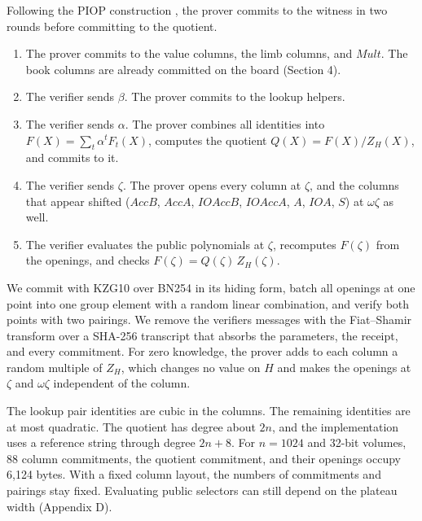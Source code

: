 Following the PIOP construction \cite{plonk2019}, the prover commits to the witness in two rounds before committing to the quotient.

\begin{enumerate}
\def\labelenumi{\arabic{enumi}.}
\item
  The prover commits to the value columns, the limb columns, and \(Mult\). The book columns are already committed on the board (Section 4).
\item
  The verifier sends \(\beta\). The prover commits to the lookup helpers.
\item
  The verifier sends \(\alpha\). The prover combines all identities into \(F(X) = \sum_t \alpha^t F_t(X)\), computes the quotient \(Q(X) = F(X)/Z_H(X)\), and commits to it.
\item
  The verifier sends \(\zeta\). The prover opens every column at \(\zeta\), and the columns that appear shifted (\(AccB\), \(AccA\), \(IOAccB\), \(IOAccA\), \(A\), \(IOA\), \(S\)) at \(\omega\zeta\) as well.
\item
  The verifier evaluates the public polynomials at \(\zeta\), recomputes \(F(\zeta)\) from the openings, and checks \(F(\zeta) = Q(\zeta)\, Z_H(\zeta)\).
\end{enumerate}

We commit with KZG10 \cite{kzg2010} over BN254 in its hiding form, batch all openings at one point into one group element with a random linear combination, and verify both points with two pairings. We remove the verifier\textquotesingle s messages with the Fiat--Shamir transform over a SHA-256 transcript that absorbs the parameters, the receipt, and every commitment. For zero knowledge, the prover adds to each column a random multiple of \(Z_H\), which changes no value on \(H\) and makes the openings at \(\zeta\) and \(\omega\zeta\) independent of the column.

The lookup pair identities are cubic in the columns. The remaining identities are at most quadratic. The quotient has degree about \(2n\), and the implementation uses a reference string through degree \(2n+8\). For \(n=1024\) and 32-bit volumes, 88 column commitments, the quotient commitment, and their openings occupy 6,124 bytes. With a fixed column layout, the numbers of commitments and pairings stay fixed. Evaluating public selectors can still depend on the plateau width (Appendix D).

